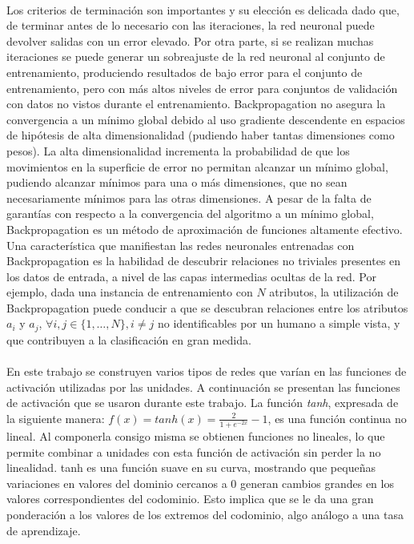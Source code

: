 \newpage %

\paragraph{} Los criterios de terminación son importantes y su elección es delicada dado que, de terminar antes de lo necesario con las iteraciones, la red neuronal puede devolver salidas con un error elevado.
Por otra parte, si se realizan muchas iteraciones se puede generar un sobreajuste de la red neuronal al conjunto de entrenamiento, produciendo resultados de bajo error para el conjunto de entrenamiento, pero con más altos niveles de error para conjuntos de validación con datos no vistos durante el entrenamiento.
Backpropagation no asegura la convergencia a un mínimo global debido al uso gradiente descendente en espacios de hipótesis de alta dimensionalidad (pudiendo haber tantas dimensiones como pesos).
La alta dimensionalidad incrementa la probabilidad de que los movimientos en la superficie de error no permitan alcanzar un mínimo global, pudiendo alcanzar mínimos para una o más dimensiones, que no sean necesariamente mínimos para las otras dimensiones.
A pesar de la falta de garantías con respecto a la convergencia del algoritmo a un mínimo global, Backpropagation es un método de aproximación de funciones altamente efectivo.
Una característica que manifiestan las redes neuronales entrenadas con Backpropagation es la habilidad de descubrir relaciones no triviales presentes en los datos de entrada, a nivel de las capas intermedias ocultas de la red.
Por ejemplo, dada una instancia de entrenamiento con $N$ atributos, la utilización de Backpropagation puede conducir a que se descubran relaciones entre los atributos $a_i$ y $a_j$,  $\forall i, j \in \{1, \dots, N\}, i \neq j$ no identificables por un humano a simple vista, y que contribuyen a la clasificación en gran medida.

\paragraph{}En este trabajo se construyen varios tipos de redes que varían en las funciones de activación utilizadas por las unidades.
A continuación se presentan las funciones de activación que se usaron durante este trabajo. 
La función \textit{tanh}, expresada de la siguiente manera: $f(x) = tanh(x) = \frac{2}{1 + e^{-2x}} - 1 $, es una función continua no lineal.
Al componerla consigo misma se obtienen funciones no lineales, lo que permite combinar a unidades con esta función de activación sin perder la no linealidad. 
tanh es una función suave en su curva, mostrando que pequeñas variaciones en valores del dominio cercanos a 0 generan cambios grandes en los valores correspondientes del codominio.
Esto implica que se le da una gran ponderación a los valores de los extremos del codominio, algo análogo a una tasa de aprendizaje. 

